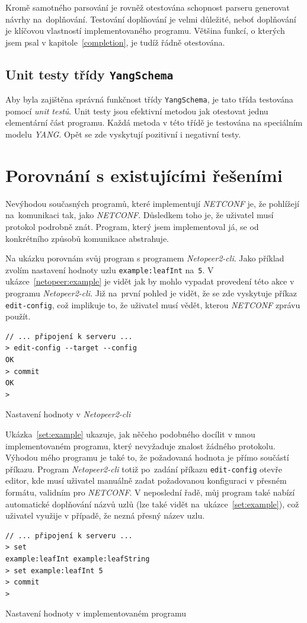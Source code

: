 \documentclass[thesis=B,czech,hidelinks]{FITthesis}[2019/03/06]
\begin{document}
Kromě samotného parsování je rovněž otestována schopnost parseru generovat návrhy na~doplňování. Testování doplňování je velmi důležité, neboť doplňování je klíčovou vlastností implementovaného programu. Většina funkcí, o kterých jsem psal v kapitole~\ref{completion}, je tudíž řádně otestována.

\subsection{Unit testy třídy \texttt{YangSchema}}
Aby byla zajištěna správná funkčnost třídy \texttt{YangSchema}, je tato třída testována pomocí \textit{unit testů}. Unit testy jsou efektivní metodou jak otestovat jednu elementární část programu. Každá metoda v této třídě je testována na speciálním modelu \textit{YANG}. Opět se zde vyskytují pozitivní i negativní testy.


\section{Porovnání s existujícími řešeními}
Nevýhodou současných programů, které implementují \textit{NETCONF} je, že pohlížejí na~komunikaci tak, jako \textit{NETCONF}. Důsledkem toho je, že uživatel musí protokol podrobně znát. Program, který jsem implementoval já, se od konkrétního způsobů komunikace abstrahuje.

Na ukázku porovnám svůj program s programem \textit{Netopeer2-cli}. Jako příklad zvolím nastavení hodnoty uzlu \texttt{example:leafInt} na~\texttt{5}. V ukázce~\ref{netopeer:example} je vidět jak by mohlo vypadat provedení této akce v programu \textit{Netopeer2-cli}. Již na~první pohled je vidět, že se zde vyskytuje příkaz \texttt{edit-config}, což implikuje to, že uživatel musí vědět, kterou \textit{NETCONF} zprávu použít.

\begin{listing}[H]
\begin{verbatim}
// ... připojení k serveru ...
> edit-config --target --config
OK
> commit
OK
>
\end{verbatim}
\caption{Nastavení hodnoty v \textit{Netopeer2-cli}\label{netopeer:example}}
\end{listing}

Ukázka~\ref{set:example} ukazuje, jak něčeho podobného docílit v mnou implementovaném programu, který nevyžaduje znalost žádného protokolu. Výhodou mého programu je také to, že požadovaná hodnota je přímo součástí příkazu. Program \textit{Netopeer2-cli} totiž po~zadání příkazu \texttt{edit-config} otevře editor, kde musí uživatel manuálně zadat požadovanou konfiguraci v přesném formátu, validním pro \textit{NETCONF}. V neposlední řadě, můj program také nabízí automatické doplňování názvů uzlů (lze také vidět na~ukázce~\ref{set:example}), což uživatel využije v případě, že nezná přesný název uzlu.
\begin{listing}[H]
\begin{verbatim}
// ... připojení k serveru ...
> set
example:leafInt example:leafString
> set example:leafInt 5
> commit
>
\end{verbatim}
\caption{Nastavení hodnoty v implementovaném programu}\label{set:example}
\end{listing}
\end{document}
